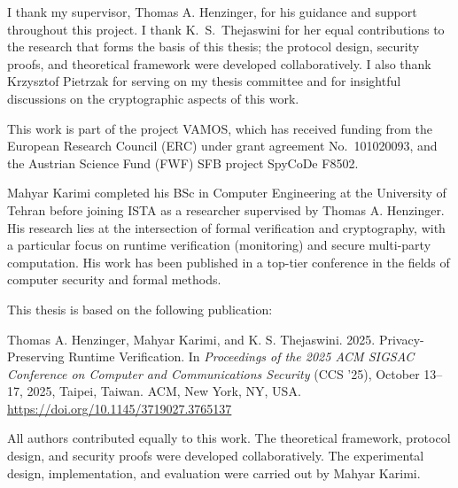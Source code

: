 \documentclass[final]{istaustriathesis}
\begin{document}
\begin{acknowledgements}
I thank my supervisor, Thomas A. Henzinger, for his guidance and support throughout this project.
I thank K.~S.~Thejaswini for her equal contributions to the research that forms the basis of this thesis; the protocol design, security proofs, and theoretical framework were developed collaboratively.
I also thank Krzysztof Pietrzak for serving on my thesis committee and for insightful discussions on the cryptographic aspects of this work.

This work is part of the project VAMOS, which has received funding from the European Research Council (ERC) under grant agreement No.\ 101020093, and the Austrian Science Fund (FWF) SFB project SpyCoDe F8502.
\end{acknowledgements}

\begin{aboutauthor}
Mahyar Karimi completed his BSc in Computer Engineering at the University of Tehran
before joining ISTA as a researcher supervised by Thomas A. Henzinger.
His research lies at the intersection of
formal verification and cryptography,
with a particular focus on runtime verification (monitoring)
and secure multi-party computation.
His work has been published in a top-tier conference
in the fields of computer security and formal methods.
\end{aboutauthor}

\begin{publicationlist}
This thesis is based on the following publication:

\medskip

\noindent
Thomas A. Henzinger, Mahyar Karimi, and K. S. Thejaswini.
2025. Privacy-Preserving Runtime Verification.
In \textit{Proceedings of the 2025 ACM SIGSAC Conference on Computer and Communications Security}
(CCS '25), October 13--17, 2025, Taipei, Taiwan.
ACM, New York, NY, USA. \url{https://doi.org/10.1145/3719027.3765137}

\medskip

\noindent
All authors contributed equally to this work.
The theoretical framework, protocol design, and security proofs
were developed collaboratively. The experimental design, implementation,
and evaluation were carried out by Mahyar Karimi.
\end{publicationlist}

\cleardoublepage
\renewcommand{\contentsname}{Table of Contents} %
\tableofcontents
\listoffigures
\end{document}

